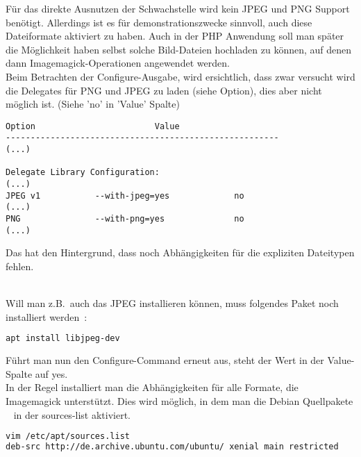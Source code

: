 Für das direkte Ausnutzen der Schwachstelle wird kein JPEG und PNG Support benötigt.
Allerdings ist es für demonstrationszwecke sinnvoll, auch diese Dateiformate aktiviert zu haben.
Auch in der PHP Anwendung soll man später die Möglichkeit haben selbst solche Bild-Dateien hochladen zu können,
auf denen dann Imagemagick-Operationen angewendet werden.\\

Beim Betrachten der Configure-Ausgabe, wird ersichtlich,
dass zwar versucht wird die Delegates für PNG und JPEG zu laden (siehe Option),
dies aber nicht möglich ist. (Siehe 'no' in 'Value' Spalte)

\begin{lstlisting}[language=Text, caption=Imagemagick Installation: Auszug aus Configure-Output,label={lst:installconfigureoutput}]
              Option                        Value
-------------------------------------------------------
(...)

Delegate Library Configuration:
(...)
JPEG v1           --with-jpeg=yes             no
(...)
PNG               --with-png=yes              no
(...)
\end{lstlisting}
\vspace{5mm}

Das hat den Hintergrund, dass noch Abhängigkeiten für die expliziten Dateitypen fehlen.\\\\

\newpage

Will man z.B.\ auch das JPEG installieren können, muss folgendes Paket noch installiert werden~\cite{ImageMagickPNGDelegate}:

\begin{lstlisting}[language=Bash, caption=Imagemagick Installation: Delegate Dependencies,label={lst:installdelegatedep}]
apt install libjpeg-dev
\end{lstlisting}
\vspace{5mm}

Führt man nun den Configure-Command erneut aus, steht der Wert in der Value-Spalte auf yes.\\

In der Regel installiert man die Abhängigkeiten für alle Formate, die Imagemagick unterstützt.
Dies wird möglich, in dem man die Debian Quellpakete
~\cite{DateiEtcApt} in der sources-list aktiviert.~\cite{HowInstallImageMagick}\\


\begin{lstlisting}[language=Bash, caption=Imagemagick Installation: Sources List,label={lst:installsourcelist}]
vim /etc/apt/sources.list
deb-src http://de.archive.ubuntu.com/ubuntu/ xenial main restricted
\end{lstlisting}
\vspace{5mm}

